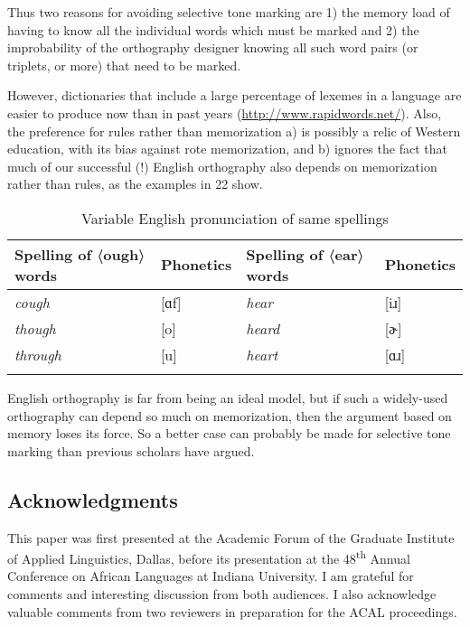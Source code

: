 \documentclass[output=paper]{langscibook}
\begin{document}
Thus two reasons for avoiding selective tone marking are 1) the memory load of having to know all the individual words which must be marked and 2) the improbability of the orthography designer knowing all such word pairs (or triplets, or more) that need to be marked.

However, dictionaries that include a large percentage of lexemes in a language are easier to produce now than in past years (\url{http://www.rapidwords.net/}). Also, the preference for rules rather than memorization a) is possibly a relic of Western education, with its bias against rote memorization, and b) ignores the fact that much of our successful (!) English orthography also depends on memorization rather than rules, as the examples in 22 show.

\begin{table}
    \begin{tabular}{llll}
        \lsptoprule
        Spelling of 〈ough〉 words & Phonetics &  Spelling of 〈ear〉 words & Phonetics\\\midrule
        \textit{cough} & [ɑf] &  \textit{hear} & [iɹ]\\
        \textit{though} & [o] &  \textit{heard} & [ɚ]\\
        \textit{through} & [u] &  \textit{heart} & [ɑɹ]\\
        \lspbottomrule
    \end{tabular}
    \caption{Variable English pronunciation of same spellings}
    \label{bkm:Ref483321584}
\end{table}

English orthography is far from being an ideal model, but if such a widely-used orthography can depend so much on memorization, then the argument based on memory loses its force. So a better case can probably be made for selective tone marking than previous scholars have argued.

\subsection{ Acknowledgments}

This paper was first presented at the Academic Forum of the Graduate Institute of Applied Linguistics, Dallas, before its presentation at the 48\textsuperscript{th} Annual Conference on African Languages at Indiana University. I am grateful for comments and interesting discussion from both audiences. I also acknowledge valuable comments from two reviewers in preparation for the ACAL proceedings.


{\sloppy
\printbibliography[heading=subbibliography,notkeyword=this] 
}
\end{document}
